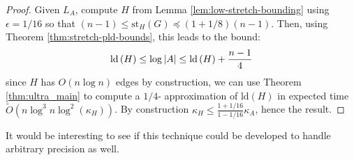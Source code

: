 \begin{proof}Given $L_{A}$, compute $H$ from Lemma \ref{lem:low-stretch-bounding}
using $\epsilon=1/16$ so that $\left(n-1\right)\leq\text{st}_{H}\left(G\right)\preceq\left(1+1/8\right)\left(n-1\right)$.
Then, using Theorem \ref{thm:stretch-pld-bounds}, this leads to the
bound:
\[
\text{\text{ld}}\left(H\right)\leq\log\left|A\right|\leq\text{ld}\left(H\right)+\frac{n-1}{4}
\]
since $H$ has $O\left(n\log n\right)$ edges by construction, we
can use Theorem \ref{thm:ultra_main} to compute a $1/4$- approximation
of $\text{ld}\left(H\right)$ in expected time $\tilde{O}\left(n\log^{3}n\log^{2}\left(\kappa_{H}\right)\right)$.
By construction $\kappa_{H}\leq\frac{1+1/16}{1-1/16}\kappa_{A}$,
hence the result.

\end{proof}

It would be interesting to see if this technique could be developed
to handle arbitrary precision as well.
